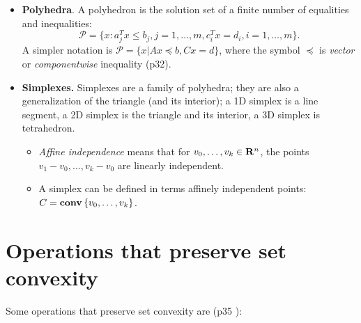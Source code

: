 \documentclass[a4paper, oneside]{book}
\begin{document}
\begin{itemize}
\item \textbf{Polyhedra}. A polyhedron is the solution set of a finite number of equalities and inequalities:
$$\mathcal P =\{ x : a_j^T x \le b_j, j=1, \hdots, m, c^T_i x= d_i, i=1,\hdots,m \}. $$
A simpler notation is $\mathcal P = \{x | Ax \preceq b, Cx = d \}$, where the symbol $\preceq$ is \textit{vector} or \textit{componentwise} inequality (p32).
\item \textbf{Simplexes.}  Simplexes are a family of polyhedra; they are also a generalization of the triangle (and its interior); \ie a 1D simplex is a line segment, a 2D simplex is the triangle and its interior, a 3D simplex is tetrahedron. 
	\begin{itemize}
	\item \textit{Affine independence} means that for $v_0, \hdots, v_k \in \mathbf R^n$, the points $v_1-v_0, \hdots, v_k-v_0$ are linearly independent.
	\item A simplex can be defined in terms affinely independent points: $C=\textbf{conv}\, \{v_0,\hdots,v_k\}$.
	\end{itemize}

\end{itemize}






\section{Operations that preserve set convexity}

Some operations that preserve set convexity are (p35 \cite{boyd04}):
\end{document}
